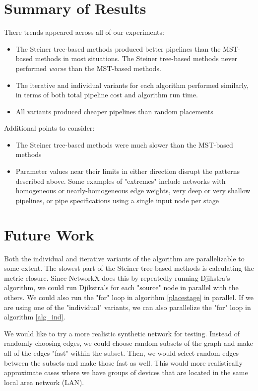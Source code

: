 \documentclass[conference]{IEEEtran}
\begin{document}
 	\section{Summary of Results}
 	There trends appeared across all of our experiments:
 	\begin{itemize}
 	    \item The Steiner tree-based methods produced better pipelines than the MST-based methods in most situations. The Steiner tree-based methods never performed \textit{worse} than the MST-based methods.
 	    \item The iterative and individual variants for each algorithm performed similarly, in terms of both total pipeline cost and algorithm run time.
 	    \item All variants produced cheaper pipelines than random placements
 	\end{itemize}
 	Additional points to consider:
 	\begin{itemize}
 	    \item The Steiner tree-based methods were much slower than the MST-based methods
 	    \item Parameter values near their limits in either direction disrupt the patterns described above. Some examples of "extremes" include networks with homogeneous or nearly-homogeneous edge weights, very deep or very shallow pipelines, or pipe specifications using a single input node per stage
 	\end{itemize}
    
 	\section{Future Work}
 	Both the individual and iterative variants of the algorithm are parallelizable to some extent. The slowest part of the Steiner tree-based methods is calculating the metric closure. Since NetworkX does this by repeatedly running Djikstra's algorithm, we could run Djikstra's for each "source" node in parallel with the others. We could also run the "for" loop in algorithm \ref{placestage} in parallel. If we are using one of the "individual" variants, we can also parallelize the "for" loop in algorithm \ref{alg_ind}.
 	
 	We would like to try a more realistic synthetic network for testing. Instead of randomly choosing edges, we could choose random subsets of the graph and make all of the edges "fast" within the subset. Then, we would select random edges between the subsets and make those fast as well. This would more realistically approximate cases where we have groups of devices that are located in the same local area network (LAN).
 	
\end{document}
